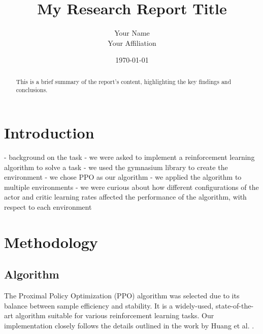 \documentclass{article}
\title{My Research Report Title}
\author{Your Name \\ Your Affiliation}
\date{\today}
\begin{document}
\maketitle

\begin{abstract}
This is a brief summary of the report's content, highlighting the key findings and conclusions.
\end{abstract}

\section{Introduction}
- background on the task
  - we were asked to implement a reinforcement learning algorithm to solve a task
  - we used the gymnasium library to create the environment
  - we chose PPO as our algorithm
  - we applied the algorithm to multiple environments
  - we were curious about how different configurations of the actor and critic learning rates affected the performance of the algorithm, with respect to each environment

\section{Methodology}

\subsection{Algorithm}
The Proximal Policy Optimization (PPO) algorithm was selected due to its balance between sample efficiency and stability. It is a widely-used, state-of-the-art algorithm suitable for various reinforcement learning tasks. Our implementation closely follows the details outlined in the work by Huang et al. \cite{shengyi2022the37implementation}.
\end{document}
